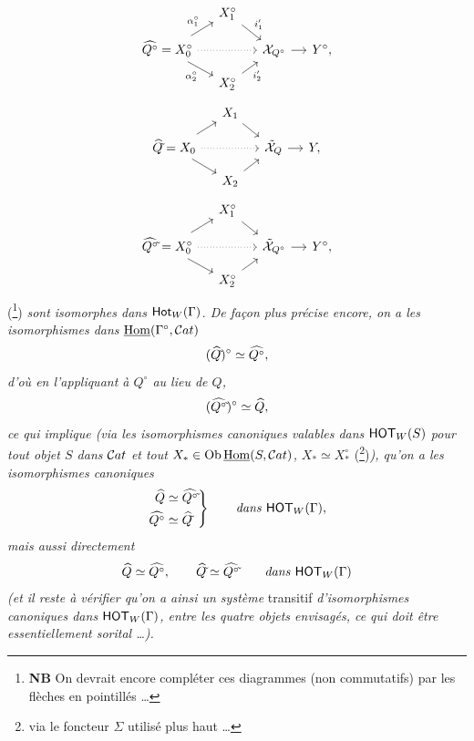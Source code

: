 \setcounter{footnote}{90}

\[
\begin{tikzcd}[row sep=small, column sep=small]
 & X_1^\circ \arrow[dr,"i^{\prime}_{1}"] & & \\
\widehat{Q^\circ} = X_0^\circ \arrow[ur,"\alpha_1^\circ"] \arrow[dr,"\alpha_2^\circ"'] \arrow[rr,dotted] & & \mathcal{X}_{Q^\circ} \arrow[r] & Y^\circ, \\
 & X_2^\circ \arrow[ur,"i^{\prime}_{2}"'] & &
\end{tikzcd}
\]
\[
\begin{tikzcd}[row sep=small, column sep=small]
 & X_1 \arrow[dr] & & \\
\widehat{Q}\tld = X_0 \arrow[ur] \arrow[dr] \arrow[rr,dotted] & & \tilde{\mathcal{X}}_{Q} \arrow[r] & Y, \\
 & X_2 \arrow[ur] & &
\end{tikzcd}
\]
\[
\begin{tikzcd}[row sep=small, column sep=small]
 & X_1^\circ \arrow[dr] & & \\
\widehat{Q^\circ}\tld = X_0^\circ \arrow[ur] \arrow[dr] \arrow[rr,dotted] & & \tilde{\mathcal{X}}_{Q^\circ} \arrow[r] & Y^\circ, \\
 & X_2^\circ \arrow[ur] & &
\end{tikzcd}
\]
(\footnote{\textbf{NB} On devrait encore compléter ces diagrammes (non commutatifs) par les flèches en pointillés \dots}) \textit{sont isomorphes dans} $\mathsf{Hot}_W(\Gamma)$\textit{. De façon plus précise encore, on a les isomorphismes dans} $\underline{\operatorname{Hom}}(\Gamma^\circ,\mathcal{C}at)$
\[
(\widehat{Q}\tilde{})^\circ \simeq \widehat{Q^\circ},
\]
\textit{d'où en l'appliquant à $Q^\circ$ au lieu de $Q$,}
\[
(\widehat{Q^\circ}\tilde{})^\circ \simeq \widehat{Q},
\]
\textit{ce qui implique (via les isomorphismes canoniques valables dans} $\mathsf{HOT}_W(S)$ \textit{pour tout objet $S$ dans} $\mathcal{C}at$ \textit{et tout} $X_* \in \mathrm{Ob}\,\underline{\operatorname{Hom}}(S,\mathcal{C}at)$\textit{,} $X_* \simeq X_*^\circ$ (\footnote{via le foncteur $\Sigma$ utilisé plus haut \dots})\textit{), qu'on a les isomorphismes canoniques}
\[
\left.\begin{aligned}
\widehat{Q} &\simeq \widehat{Q^\circ}\tilde{} \\
\widehat{Q^\circ} &\simeq \widehat{Q}\tilde{}
\end{aligned}\right\}
\qquad \text{\textit{dans} } \mathsf{HOT}_W(\Gamma),
\]
\textit{mais aussi directement}
\[
\widehat{Q} \simeq \widehat{Q^\circ}, \qquad \widehat{Q}\tilde{} \simeq \widehat{Q^\circ}\tilde{} \qquad \text{\textit{dans} } \mathsf{HOT}_W(\Gamma)
\]
\textit{(et il reste à vérifier qu'on a ainsi un système} transitif \textit{d'isomorphismes canoniques dans} $\mathsf{HOT}_W(\Gamma)$\textit{, entre les quatre objets envisagés, ce qui doit être essentiellement sorital \dots).}

